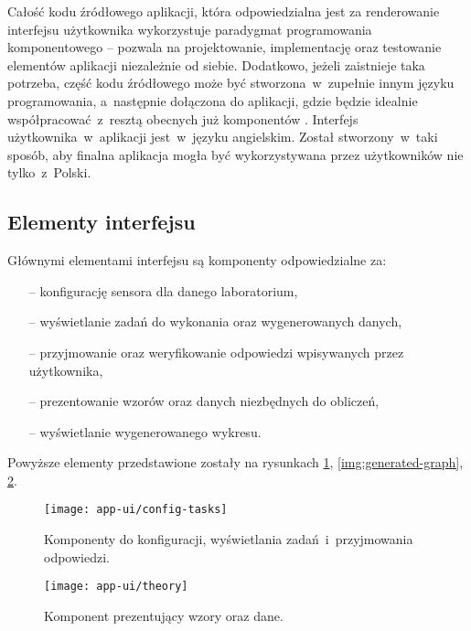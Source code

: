 Całość kodu źródłowego aplikacji, która odpowiedzialna jest za renderowanie interfejsu użytkownika
wykorzystuje paradygmat programowania komponentowego -- pozwala na projektowanie, implementację oraz
testowanie elementów aplikacji niezależnie od siebie. Dodatkowo, jeżeli zaistnieje taka potrzeba,
część kodu źródłowego może być stworzona~w~zupełnie innym języku programowania, a~następnie
dołączona do aplikacji, gdzie będzie idealnie współpracować~z~resztą obecnych już komponentów
\cite{component-programming}. Interfejs użytkownika~w~aplikacji jest~w~języku angielskim. Został
stworzony~w~taki sposób, aby finalna aplikacja mogła być wykorzystywana przez użytkowników nie
tylko~z~Polski.

\subsection{Elementy interfejsu}
Głównymi elementami interfejsu są komponenty odpowiedzialne za:
\begin{itemize}
  \item[--] konfigurację sensora dla danego laboratorium,
  \item[--] wyświetlanie zadań do wykonania oraz wygenerowanych danych,
  \item[--] przyjmowanie oraz weryfikowanie odpowiedzi wpisywanych przez użytkownika,
  \item[--] prezentowanie wzorów oraz danych niezbędnych do obliczeń,
  \item[--] wyświetlanie wygenerowanego wykresu.
\end{itemize}
Powyższe elementy przedstawione zostały na rysunkach \ref{img:config-tasks},
\ref{img:generated-graph}, \ref{img:theory}.

\begingroup
\begin{figure}[!htbp]
  \centering
  \texttt{[image: app-ui/config-tasks]}
  \caption{\label{img:config-tasks}Komponenty do konfiguracji, wyświetlania zadań~i~przyjmowania
    odpowiedzi.}
\end{figure}

\begin{figure}[!htbp]
  \centering
  \texttt{[image: app-ui/theory]}
  \caption{\label{img:theory}Komponent prezentujący wzory oraz dane.}
\end{figure}

